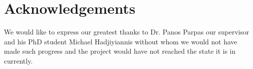 \documentclass[10pt, a4paper]{report}
\begin{document}
\section{Acknowledgements}\label{sec:ack}
We would like to express our greatest thanks to Dr. Panos Parpas our supervisor and his PhD student Michael Hadjiyiannis without whom we would not have made such progress and the project would have not reached the state it is in currently.



\end{document}
